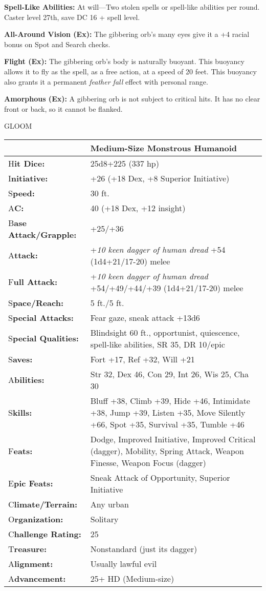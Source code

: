 \documentclass{article}
\begin{document}
{\textbf{Spell-Like Abilities: }At will---Two stolen spells or spell-like abilities 
per round. Caster level 27th, save DC 16 + spell level. 

\textbf{All-Around Vision (Ex): }The gibbering orb's many eyes give it a +4 racial 
bonus on Spot and Search checks. 

\textbf{Flight (Ex):} The gibbering orb's body is naturally buoyant. This buoyancy 
allows it to fly as the spell, as a free action, at a speed of 20 feet. This buoyancy 
also grants it a permanent \textit{feather fall }effect with personal range. 

\textbf{Amorphous (Ex):} A gibbering orb is not subject to critical hits. It has 
no clear front or back, so it cannot be flanked. 

\vspace{12pt}
{\LARGE{}GLOOM }

\begin{tabular}{|>{\raggedright}p{63pt}|>{\raggedright}p{263pt}|}
\hline
  & Medium-Size Monstrous Humanoid \tabularnewline
\hline
H\textbf{it Dice:} & 25d8+225 (337 hp) \tabularnewline
\hline
I\textbf{nitiative:} & +26 (+18 Dex, +8 Superior Initiative) \tabularnewline
\hline
S\textbf{peed:} & 30 ft. \tabularnewline
\hline
A\textbf{C:} & 40 (+18 Dex, +12 insight) \tabularnewline
\hline
B\textbf{ase Attack/Grapple:} & +25/+36\tabularnewline
\hline
A\textbf{ttack:} & +\textit{10 keen dagger of human dread }+54 (1d4+21/17-20) melee\tabularnewline
\hline
F\textbf{ull Attack:} & +\textit{10 keen dagger of human dread }+54/+49/+44/+39 
(1d4+21/17-20) melee\tabularnewline
\hline
S\textbf{pace/Reach:} & 5 ft./5 ft. \tabularnewline
\hline
S\textbf{pecial Attacks:} & Fear gaze, sneak attack +13d6 \tabularnewline
\hline
S\textbf{pecial Qualities:} & Blindsight 60 ft., opportunist, quiescence, spell-like 
abilities, SR 35, DR 10/epic \tabularnewline
\hline
S\textbf{aves:} & Fort +17, Ref +32, Will +21 \tabularnewline
\hline
A\textbf{bilities:} & Str 32, Dex 46, Con 29, Int 26, Wis 25, Cha 30 \tabularnewline
\hline
S\textbf{kills:} & Bluff +38, Climb +39, Hide +46, Intimidate +38, Jump +39, Listen 
+35, Move Silently +66, Spot +35, Survival +35, Tumble +46\tabularnewline
\hline
F\textbf{eats:} & Dodge, Improved Initiative, Improved Critical (dagger), Mobility, 
Spring Attack, Weapon Finesse, Weapon Focus (dagger) \tabularnewline
\hline
E\textbf{pic Feats:} & Sneak Attack of Opportunity, Superior Initiative \tabularnewline
\hline
C\textbf{limate/Terrain:} & Any urban \tabularnewline
\hline
O\textbf{rganization:} & Solitary \tabularnewline
\hline
C\textbf{hallenge Rating:} & 25 \tabularnewline
\hline
T\textbf{reasure:} & Nonstandard (just its dagger) \tabularnewline
\hline
A\textbf{lignment:} & Usually lawful evil \tabularnewline
\hline
A\textbf{dvancement:} & 25+ HD (Medium-size) \tabularnewline
\hline
\end{tabular}

}
\end{document}
